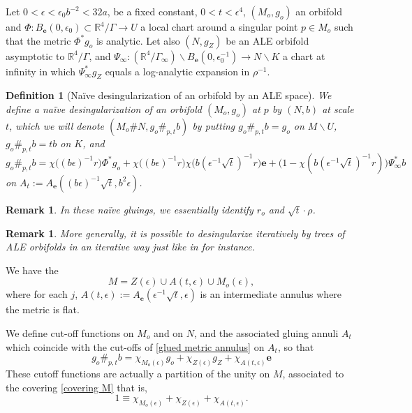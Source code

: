 \documentclass[12pt]{article}
\newtheorem{defn}[thm]{Definition}
\newtheorem{rem}[thm]{Remark}
\begin{document}
 Let $0<\epsilon<\epsilon_0b^{-2}<32 a$, be a fixed constant, $0<t<\epsilon^4$, $(M_o,g_o)$ an orbifold and $\Phi: B_\mathbf{e}(0,\epsilon_0)\subset\mathbb{R}^4\slash\Gamma \to U$ a local chart around a singular point $p\in M_o$ such that the metric $\Phi^*g_o$ is analytic. Let also $(N,{g_Z})$ be an ALE orbifold asymptotic to $\mathbb{R}^4\slash\Gamma$, and $\Psi_\infty: (\mathbb{R}^4\slash\Gamma_\infty)\backslash B_\mathbf{e}(0,\epsilon_0^{-1}) \to N\backslash K$ a chart at infinity in which $\Psi_\infty^* {g_Z}$ equals a log-analytic expansion in $\rho^{-1}$.
    
\begin{defn}[Naïve desingularization of an orbifold by an ALE space]
    We define a \emph{naïve desingularization} of an orbifold $(M_o,g_o)$ at $p$ by $(N,b)$ at scale $t$, which we will denote $(M_o\#N,g_o\#_{p,t}b)$ by putting $g_o\#_{p,t}b=g_o$ on $M\backslash U$, $g_o\#_{p,t}b=tb$ on $K$, and 
    \begin{equation}
        g_o\#_{p,t}b = \chi\big((b\epsilon)^{-1}r\big)\Phi^*g_o + \chi\big((b\epsilon)^{-1}r\big)\chi\big(b(\epsilon^{-1}\sqrt{t})^{-1}r\big) \mathbf{e} + \big(1-\chi(b(\epsilon^{-1}\sqrt{t})^{-1}r)\big) \Psi_\infty^*b\label{glued metric annulus}
    \end{equation}
    on $A_t:=A_\mathbf{e}((b\epsilon)^{-1}\sqrt{t},b^2\epsilon)$. 
\end{defn}
\begin{rem}\label{relation scales}
   In these naïve gluings, we essentially identify $r_o$ and $\sqrt{t}\cdot \rho$. 
\end{rem}
\begin{rem}
     More generally, it is possible to desingularize iteratively by trees of ALE orbifolds in an iterative way just like in \cite{ozu1} for instance.
\end{rem} 
We have the 
\begin{equation}
    M = Z(\epsilon)\cup A(t,\epsilon) \cup   M_o(\epsilon),\label{covering M}
\end{equation}
where for each $j$, $A(t,\epsilon) :=  A_\mathbf{e}(\epsilon^{-1}\sqrt{t},\epsilon)$ is an intermediate annulus where the metric is flat.

    We define cut-off functions on $M_o$ and on $N$, and the associated gluing annuli ${A_t}$ which coincide with the cut-offs of \eqref{glued metric annulus} on $A_t$, so that
    $$ g_o\#_{p,t}b = \chi_{M_o(\epsilon)}g_o+\chi_{Z(\epsilon)} g_Z+ \chi_{A(t,\epsilon)}\mathbf{e} $$
    These cutoff functions are actually a partition of the unity on $M$, associated to the covering \eqref{covering M} that is,
\begin{equation}
    1 \equiv \chi_{M_o(\epsilon)}+\chi_{Z(\epsilon)} + \chi_{A(t,\epsilon)}.\label{somme totale}
\end{equation}
\end{document}
